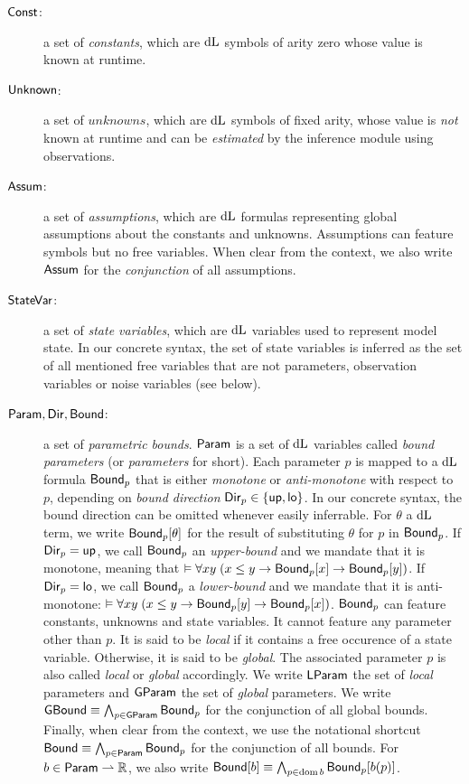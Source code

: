 \documentclass[acmsmall,screen,nonacm]{acmart}
\begin{document}
\makeMathKeywordText
\begin{description}
  \item[$\mathsf{Const}$:] a set of \emph{constants}, which are $\mathop{}\!\mathrm{d} \text{L}$ symbols of arity zero whose value is known at runtime. %
  \item[$\mathsf{Unknown}$:] a set of $unknowns$, which are $\mathop{}\!\mathrm{d} \text{L}$ symbols of fixed arity, whose value is \emph{not} known at runtime and can be \emph{estimated} by the inference module using observations.
  \item[$\mathsf{Assum}$:] a set of \emph{assumptions}, which are $\mathop{}\!\mathrm{d} \text{L}$ formulas representing global assumptions about the constants and unknowns. Assumptions can feature symbols but no free variables. When clear from the context, we also write $\mathsf{Assum}$ for the \emph{conjunction} of all assumptions.
  \item[$\mathsf{StateVar}$:] a set of \emph{state variables}, which are $\mathop{}\!\mathrm{d} \text{L}$ variables used to represent model state. In our concrete syntax, the set of state variables is inferred as the set of all mentioned free variables that are not parameters, observation variables or noise variables (see below).
  \item[$\mathsf{Param}, \mathsf{Dir}, \mathsf{Bound}$:] a set of \emph{parametric bounds}. $\mathsf{Param}$ is a set of $\mathop{}\!\mathrm{d} \text{L}$ variables called \emph{bound parameters} (or \emph{parameters} for short). Each parameter $p$ is mapped to a $\mathop{}\!\mathrm{d} \text{L}$ formula $\mathsf{Bound}_p$ that is either \emph{monotone} or \emph{anti-monotone} with respect to $p$, depending on \emph{bound direction} $\mathsf{Dir}_p \in \{ \mathsf{up}, \mathsf{lo} \}$. In our concrete syntax, the bound direction can be omitted whenever easily inferrable. For $\theta$ a $\mathop{}\!\mathrm{d} \text{L}$ term, we write $\mathsf{Bound}_{p}[\theta]$ for the result of substituting $\theta$ for $p$ in $\mathsf{Bound}_p$. If $\mathsf{Dir}_p = \mathsf{up}$, we call $\mathsf{Bound}_p$ an \emph{upper-bound} and we mandate that it is monotone, meaning that $\vDash \forall x y \; (x  \le y \rightarrow \mathsf{Bound}_{p}[x] \rightarrow \mathsf{Bound}_{p}[y])$. If $\mathsf{Dir}_p = \mathsf{lo}$, we call $\mathsf{Bound}_p$ a \emph{lower-bound} and we mandate that it is anti-monotone: $\vDash \forall x y \; (x \le y \rightarrow \mathsf{Bound}_{p}[y] \rightarrow \mathsf{Bound}_{p}[x])$. $\mathsf{Bound}_p$ can feature constants, unknowns and state variables. It cannot feature any parameter other than $p$. It is said to be \emph{local} if it contains a free occurence of a state variable. Otherwise, it is said to be \emph{global}. The associated parameter $p$ is also called \emph{local} or \emph{global} accordingly. We write $\mathsf{LParam}$ the set of \emph{local} parameters and $\mathsf{GParam}$ the set of \emph{global} parameters. We write $\mathsf{GBound} \equiv \bigwedge_{p \in \mathsf{GParam}} \mathsf{Bound}_p$ for the conjunction of {all} global bounds. Finally, when clear from the context, we use the notational shortcut $\mathsf{Bound} \equiv \bigwedge_{p \in \mathsf{Param}} \mathsf{Bound}_p$ for the conjunction of all bounds. For $b \in \mathsf{Param} \rightharpoonup \mathbb{R}$, we also write $\mathsf{Bound}[b] \equiv \bigwedge_{p \in \operatorname{\text{dom}} b} \mathsf{Bound}_{p}[b(p)]$. %

\end{description}
\end{document}
